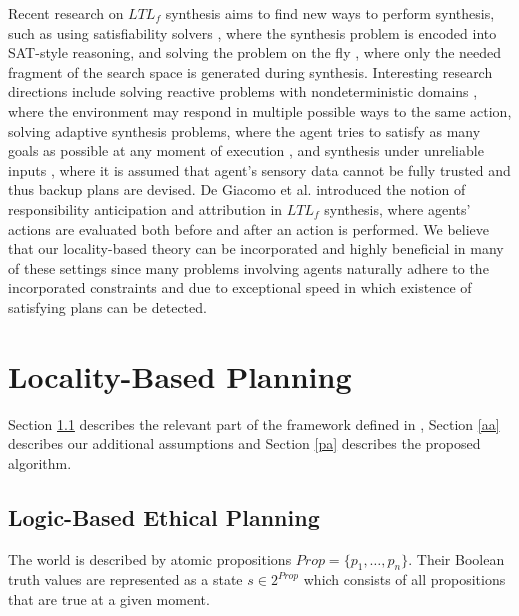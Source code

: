 \documentclass[a4paper,fleqn]{cas-dc}
\begin{document}
Recent research on $LTL_f$ synthesis aims to find new ways to perform synthesis, such as using satisfiability solvers \cite{favorito2023DPLL, ciao2024synthesis}, where the synthesis problem is encoded into SAT-style reasoning, and solving the problem on the fly \cite{xiao2025fly}, where only the needed fragment of the search space is generated during synthesis. Interesting research directions include solving reactive problems with nondeterministic domains \cite{duret2025engineering}, where the environment may respond in multiple possible ways to the same action, solving adaptive synthesis problems, where the agent tries to satisfy as many goals as possible at any moment of execution \cite{giacomo2025}, and synthesis under unreliable inputs \cite{hagemeier2025}, where it is assumed that agent's sensory data cannot be fully trusted and thus backup plans are devised. De Giacomo et al. \cite{giacomoResp2025} introduced the notion of responsibility anticipation and attribution in $LTL_f$ synthesis, where agents' actions are evaluated both before and after an action is performed. We believe that our locality-based theory can be incorporated and highly beneficial in many of these settings since many problems involving agents naturally adhere to the incorporated constraints and due to exceptional speed in which existence of satisfying plans can be detected. %

\section{Locality-Based Planning}\label{lbp}

Section \ref{lbep} describes the relevant part of the framework defined in \cite{grandi2022logic}, Section \ref{aa} describes our additional assumptions and Section \ref{pa} describes the proposed algorithm.

\subsection{Logic-Based Ethical Planning}\label{lbep}

The world is described by atomic propositions $Prop=\{p_1, \dots, p_n\}$.
Their Boolean truth values are represented as a state $s\in 2^{Prop}$ which
consists of all propositions that are true at a given moment.
\end{document}
